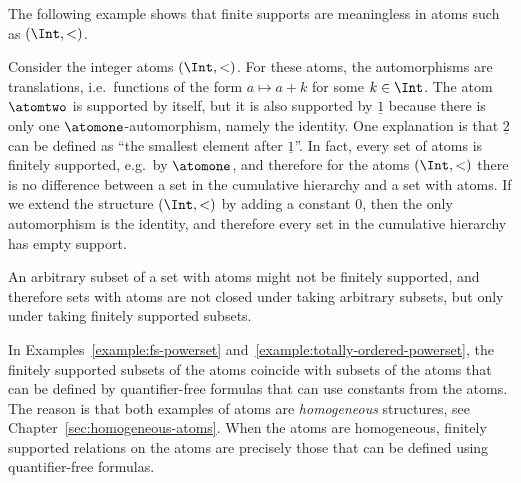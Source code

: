  The following example shows that finite supports are meaningless in atoms such as $(\Int,<)$.
 \begin{myexample}\label{ex:integers-nonexample}
Consider the integer atoms $(\Int, <)$. For these atoms, the automorphisms are translations, i.e.~functions of the form $a \mapsto a+k$ for some $k \in \Int$. The atom $\atomtwo$ is supported by itself, but it is also supported by $\underline 1$ because there is only one $\atomone$-automorphism, namely the identity. One explanation is that $\underline 2$ can be defined as ``the smallest element after $\underline 1$''. In fact, every set of atoms is finitely supported, e.g.~by $\atomone$, and therefore for the atoms $(\Int,<)$ there is no difference between a set in the cumulative hierarchy and a set with atoms. If we extend the structure $(\Int,<)$ by adding a constant $0$, then the only automorphism is the identity, and therefore every set in the cumulative hierarchy has empty support.
 \end{myexample}
 





An arbitrary subset of a set with atoms might not be finitely supported, and therefore sets with atoms are not closed under taking arbitrary subsets, but only under taking finitely supported subsets.





In Examples~\ref{example:fs-powerset} and~\ref{example:totally-ordered-powerset}, the finitely supported subsets of the atoms coincide with subsets of the atoms that can be defined by quantifier-free formulas that can use constants from the atoms. The reason is that both examples of atoms are \emph{homogeneous} structures, see Chapter~\ref{sec:homogeneous-atoms}. When the atoms are homogeneous, finitely supported relations on the atoms are precisely those that can be defined using quantifier-free formulas.





\exercisepart


















